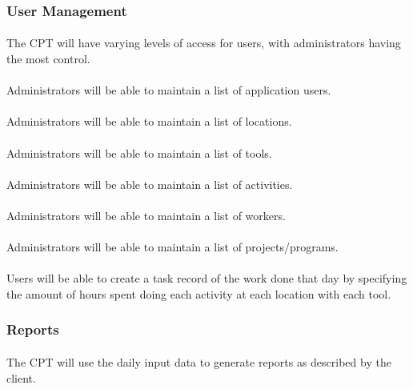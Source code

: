 \documentclass[12pt]{article}
\begin{document}
\subsubsection{User Management}\label{sec:Users}
\paragraph{} The CPT will have varying levels of access for users, with administrators having the most control.
\paragraph{} Administrators will be able to maintain a list of application users.
\paragraph{} Administrators will be able to maintain a list of locations.
\paragraph{} Administrators will be able to maintain a list of tools.
\paragraph{} Administrators will be able to maintain a list of activities.
\paragraph{} Administrators will be able to maintain a list of workers.
\paragraph{} Administrators will be able to maintain a list of projects/programs.
\paragraph{} Users will be able to create a task record of the work done that day by specifying the amount of hours spent doing each activity at each location with each tool.


\subsubsection{Reports}\label{sec:Reports}
\paragraph{} The CPT will use the daily input data to generate reports as described by the client.
\end{document}
